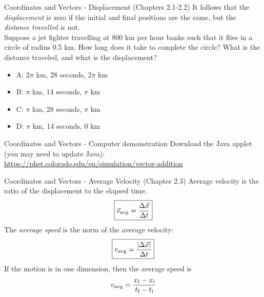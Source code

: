 \documentclass{beamer}
\begin{document}
\begin{frame}{Coordinates and Vectors - Displacement (Chapters 2.1-2.2)}
It follows that the \textit{displacement} is zero if the initial and final positions are the same, but the \textit{distance travelled} is not.\\
\vspace{0.2cm}
\small
Suppose a jet fighter travelling at 800 km per hour banks such that it flies in a circle of radius 0.5 km.  How long does it take to complete the circle?  What is the distance traveled, and what is the displacement?
\begin{itemize}
\item A: $2\pi$ km, 28 seconds, $2\pi$ km
\item B: $\pi$ km, 14 seconds, $\pi$ km
\item C: $\pi$ km, 28 seconds, $\pi$ km
\item D: $\pi$ km, 14 seconds, $0$ km
\end{itemize}
\end{frame}

\begin{frame}{Coordinates and Vectors - Computer demonstration}
Download the Java applet (you may need to update Java): \\
\url{https://phet.colorado.edu/en/simulation/vector-addition}
\end{frame}

\begin{frame}{Coordinates and Vectors - Average Velocity  (Chapter 2.3)}
\alert{Average velocity} is the ratio of the \alert{displacement} to the elapsed time.\\
\begin{equation}
\boxed{\vec{v}_{\rm avg} = \frac{\Delta \vec{x}}{\Delta t}}
\end{equation}
The \textit{average speed} is the norm of the average velocity:
\begin{equation}
\boxed{v_{\rm avg} = \frac{|\Delta \vec{x}|}{\Delta t}}
\end{equation}
If the motion is in one dimension, then the average speed is
\begin{equation}
v_{\rm avg} = \frac{x_{\rm f} - x_{\rm i}}{t_{\rm f} - t_{\rm i}}
\end{equation}
\end{frame}
\end{document}
